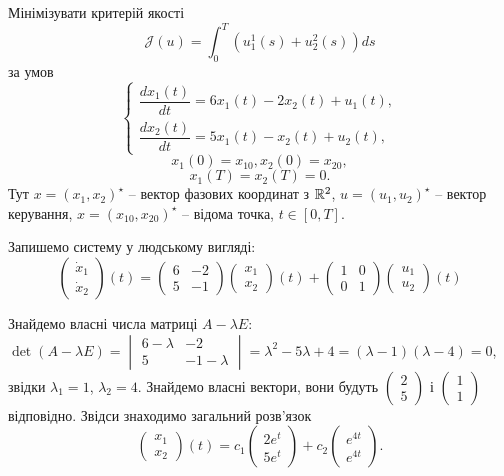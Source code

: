 \begin{problem}
    Мінімізувати критерій якості 
    \[ \mathcal{J}(u) = \int_0^T (u_1^1(s) + u_2^2(s)) ds \]
    за умов \[ \left\{ \begin{aligned} \dfrac{dx_1(t)}{dt} = 6x_1(t) - 2x_2(t) + u_1(t), \\ \dfrac{dx_2(t)}{dt} = 5x_1(t) - x_2(t) + u_2(t), \end{aligned} \right. \]
    \[ x_1(0) = x_{10}, x_2(0) = x_{20}, \] 
    \[ x_1(T) = x_2(T) = 0. \]
    Тут $x = (x_1, x_2)^\star$ -- вектор фазових координат з $\mathbb{R}^2$, $u=(u_1,u_2)^\star$ -- вектор керування, $x = (x_{10}, x_{20})^\star$ -- відома точка, $t \in [0, T]$.
\end{problem}

\begin{solution}
    Запишемо систему у людському вигляді:
    \[ \begin{pmatrix} \dot x_1 \\ \dot x_2 \end{pmatrix} (t) = \begin{pmatrix} 6 & -2 \\ 5 & -1 \end{pmatrix} \begin{pmatrix} x_1 \\ x_2 \end{pmatrix} (t) + \begin{pmatrix} 1 & 0 \\ 0 & 1 \end{pmatrix} \begin{pmatrix} u_1 \\ u_2 \end{pmatrix} (t) \]
    
    Знайдемо власні числа матриці $A - \lambda E$: $\det(A - \lambda E) = \begin{vmatrix} 6 - \lambda & -2 \\ 5 & -1 - \lambda \end{vmatrix} = \lambda^2 - 5\lambda + 4 = (\lambda - 1) (\lambda - 4) = 0$, звідки $\lambda_1 = 1$, $\lambda_2 = 4$. Знайдемо власні вектори, вони будуть $\begin{pmatrix} 2 \\ 5 \end{pmatrix}$ і $\begin{pmatrix} 1 \\ 1 \end{pmatrix}$ відповідно. Звідси знаходимо загальний розв'язок
    \[ \begin{pmatrix} x_1 \\ x_2 \end{pmatrix} (t) = c_1 \begin{pmatrix} 2e^t \\ 5e^t \end{pmatrix} + c_2 \begin{pmatrix} e^{4t} \\ e^{4t} \end{pmatrix}. \]
    

\end{solution}
